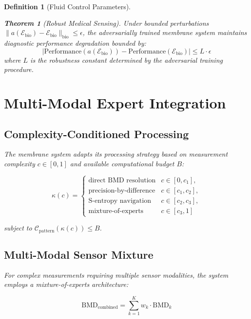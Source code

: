 \documentclass[12pt,a4paper]{article}
\newtheorem{theorem}{Theorem}
\newtheorem{definition}{Definition}
\begin{document}
\begin{definition}[Fluid Control Parameters]
\begin{theorem}[Robust Medical Sensing]
Under bounded perturbations $\|a(\mathcal{E}_{\text{bio}}) - \mathcal{E}_{\text{bio}}\|_{\text{bio}} \leq \epsilon$, the adversarially trained membrane system maintains diagnostic performance degradation bounded by:
\begin{equation}
|\text{Performance}(a(\mathcal{E}_{\text{bio}})) - \text{Performance}(\mathcal{E}_{\text{bio}})| \leq L \cdot \epsilon
\end{equation}
where $L$ is the robustness constant determined by the adversarial training procedure.
\end{theorem}

\section{Multi-Modal Expert Integration}

\subsection{Complexity-Conditioned Processing}

The membrane system adapts its processing strategy based on measurement complexity $c \in [0,1]$ and available computational budget $B$:

\begin{equation}
\kappa(c) = \begin{cases}
\text{direct BMD resolution} & c \in [0, c_1], \\
\text{precision-by-difference} & c \in [c_1, c_2], \\
\text{S-entropy navigation} & c \in [c_2, c_3], \\
\text{mixture-of-experts} & c \in [c_3, 1]
\end{cases}
\end{equation}

subject to $\mathcal{C}_{\text{pattern}}(\kappa(c)) \leq B$.

\subsection{Multi-Modal Sensor Mixture}

For complex measurements requiring multiple sensor modalities, the system employs a mixture-of-experts architecture:

\begin{equation}
\text{BMD}_{\text{combined}} = \sum_{k=1}^{K} w_k \cdot \text{BMD}_k
\end{equation}


\end{definition}
\end{document}

